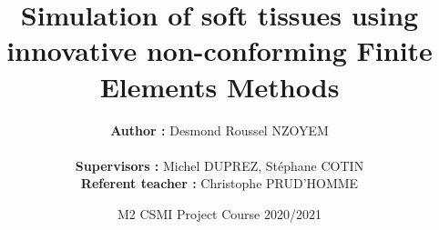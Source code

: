 \documentclass{beamer}
\begin{document}
\title[PhiFEM]{\huge Simulation of soft tissues using innovative non-conforming Finite Elements Methods }



\author[Desmond Roussel NZOYEM]{\normalsize \textbf{Author :} Desmond Roussel NZOYEM \\ \\ \small \textbf{Supervisors :} Michel DUPREZ, Stéphane COTIN \\ \textbf{Referent teacher :} Christophe PRUD'HOMME \\}

\date[\today]{M2 CSMI Project Course 2020/2021}

\begingroup  %
\begin{frame}[fragile]
\maketitle
\end{frame}
\endgroup
\end{document}
